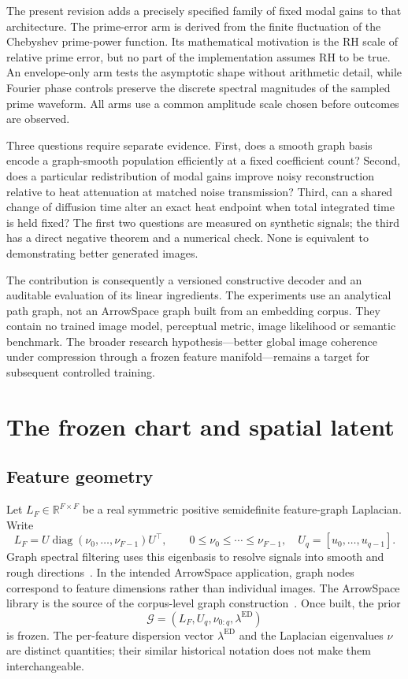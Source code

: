 \documentclass[10pt]{article}
\newcommand{\R}{\mathbb{R}}
\newcommand{\Lf}{L_F}
\newcommand{\Uq}{U_q}
\newcommand{\ed}{\lambda^{\mathrm{ED}}}
\newcommand{\diag}{\operatorname{diag}}
\begin{document}
The present revision adds a precisely specified family of fixed modal
gains to that architecture. The prime-error arm is derived from the
finite fluctuation of the Chebyshev prime-power function. Its mathematical
motivation is the RH scale of relative prime error, but no part of the
implementation assumes RH to be true. An envelope-only arm tests the
asymptotic shape without arithmetic detail, while Fourier phase controls
preserve the discrete spectral magnitudes of the sampled prime waveform.
All arms use a common amplitude scale chosen before outcomes are observed.

Three questions require separate evidence. First, does a smooth graph
basis encode a graph-smooth population efficiently at a fixed coefficient
count? Second, does a particular redistribution of modal gains improve
noisy reconstruction relative to heat attenuation at matched noise
transmission? Third, can a shared change of diffusion time alter an exact
heat endpoint when total integrated time is held fixed? The first two
questions are measured on synthetic signals; the third has a direct
negative theorem and a numerical check. None is equivalent to demonstrating
better generated images.

The contribution is consequently a versioned constructive decoder and
an auditable evaluation of its linear ingredients. The experiments use
an analytical path graph, not an ArrowSpace graph built from an embedding
corpus. They contain no trained image model, perceptual metric, image
likelihood or semantic benchmark. The broader research hypothesis---better
global image coherence under compression through a frozen feature
manifold---remains a target for subsequent controlled training.

\section{The frozen chart and spatial latent}
\label{sec:architecture}

\subsection{Feature geometry}

Let $\Lf\in\R^{F\times F}$ be a real symmetric positive semidefinite
feature-graph Laplacian. Write
\begin{equation}
 \Lf=U\diag(\nu_0,\ldots,\nu_{F-1})U^\top,\qquad
 0\leq\nu_0\leq\cdots\leq\nu_{F-1},
 \quad \Uq=[u_0,\ldots,u_{q-1}].
 \label{eq:graph}
\end{equation}
Graph spectral filtering uses this eigenbasis to resolve signals into
smooth and rough directions~\cite{shuman}. In the intended ArrowSpace
application, graph nodes correspond to feature dimensions rather than
individual images. The ArrowSpace library is the source of the
corpus-level graph construction~\cite{arrowspace}. Once built, the prior
\begin{equation}
 \mathcal G=(\Lf,\Uq,\nu_{0:q},\ed)
 \label{eq:prior}
\end{equation}
is frozen. The per-feature dispersion vector $\ed$ and the Laplacian
eigenvalues $\nu$ are distinct quantities; their similar historical
notation does not make them interchangeable.
\end{document}

